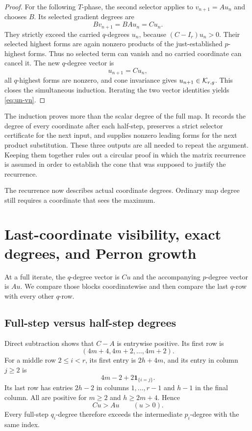 \documentclass[11pt]{article}
\theoremstyle{remark}
\numberwithin{equation}{section}
\begin{document}
\begin{proof}
For the following \(T\)-phase, the second selector applies to
\(v_{n+1}=Au_n\) and chooses \(B\).  Its selected gradient degrees are
\[
Bv_{n+1}=BAu_n=Cu_n.
\]
They strictly exceed the carried \(q\)-degrees \(u_n\), because
\((C-I_r)u_n>0\).  Their selected highest forms are again nonzero products
of the just-established \(p\)-highest forms.  Thus no selected term can
vanish and no carried coordinate can cancel it.  The new \(q\)-degree
vector is
\[
u_{n+1}=Cu_n,
\]
all \(q\)-highest forms are nonzero, and cone invariance gives
\(u_{n+1}\in\mathcal{K}_{r,g}\).  This closes the simultaneous induction.
Iterating the two vector identities yields \eqref{eq:un-vn}.
\end{proof}

The induction proves more than the scalar degree of the full map.  It records
the degree of every coordinate after each half-step, preserves a strict
selector certificate for the next input, and supplies nonzero leading forms
for the next product substitution.  These three outputs are all needed to
repeat the argument.  Keeping them together rules out a circular proof in
which the matrix recurrence is assumed in order to establish the cone that
was supposed to justify the recurrence.

The recurrence now describes actual coordinate degrees.  Ordinary map degree
still requires a coordinate that sees the maximum.

\section{Last-coordinate visibility, exact degrees, and Perron growth}\label{sec:visibility}

At a full iterate, the \(q\)-degree vector is \(Cu\) and the accompanying
\(p\)-degree vector is \(Au\).  We compare those blocks coordinatewise and
then compare the last \(q\)-row with every other \(q\)-row.

\subsection{Full-step versus half-step degrees}

Direct subtraction shows that \(C-A\) is entrywise positive.  Its first row
is
\[
(4m+4,4m+2,\ldots,4m+2).
\]
For a middle row \(2\leq i<r\), its first entry is \(2h+4m\), and its
entry in column \(j\geq2\) is
\[
4m-2+2\mathbf1_{\{i=j\}}.
\]
Its last row has entries \(2h-2\) in columns \(1,\ldots,r-1\) and
\(h-1\) in the final column.  All are positive for \(m\geq2\) and
\(h\geq2m+4\).  Hence
\begin{equation}\label{eq:C-minus-A}
Cu>Au\qquad(u>0).
\end{equation}
Every full-step \(q_i\)-degree therefore exceeds the intermediate
\(p_i\)-degree with the same index.
\end{document}
